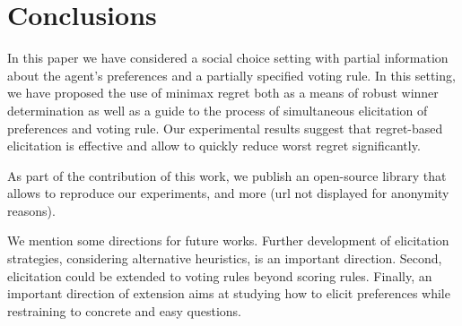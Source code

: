 \documentclass[sigconf, anonymous]{aamas}
\begin{document}
\section{Conclusions}  
\label{sec:conclusions}
In this paper we have considered a social choice setting with partial information about the agent's preferences and a partially specified voting rule.
In this setting, we have proposed the use of minimax regret both as a means of robust winner determination as well as a guide to the process of simultaneous elicitation of preferences and voting rule.
Our experimental results %
suggest that regret-based elicitation is effective and allow to quickly reduce worst regret significantly.

As part of the contribution of this work, we publish an open-source library that allows to reproduce our experiments, and more (url not displayed for anonymity reasons).

We mention some directions for future works.
Further development of elicitation strategies, considering alternative heuristics, is an important direction. 
Second, elicitation could be extended to voting rules beyond scoring rules.
Finally, an important direction of extension aims at studying how to elicit preferences while restraining to concrete and easy questions.





% 
%

 
\vfuzz=5pt

\end{document}
